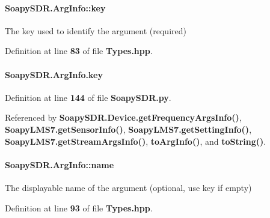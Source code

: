 \paragraph[{key}]{ Soapy\+S\+D\+R.\+Arg\+Info\+::key}\label{classSoapySDR_1_1ArgInfo_a12f61865343917c9c06b579aee3b2491}


The key used to identify the argument (required) 



Definition at line {\bf 83} of file {\bf Types.\+hpp}.

\paragraph[{key}]{\setlength{\rightskip}{0pt plus 5cm}Soapy\+S\+D\+R.\+Arg\+Info.\+key\hspace{0.3cm}{\ttfamily [static]}}\label{classSoapySDR_1_1ArgInfo_ad5250dff7ebe0ad1abc90c71c60303b8}


Definition at line {\bf 144} of file {\bf Soapy\+S\+D\+R.\+py}.



Referenced by {\bf Soapy\+S\+D\+R.\+Device.\+get\+Frequency\+Args\+Info()}, {\bf Soapy\+L\+M\+S7.\+get\+Sensor\+Info()}, {\bf Soapy\+L\+M\+S7.\+get\+Setting\+Info()}, {\bf Soapy\+L\+M\+S7.\+get\+Stream\+Args\+Info()}, {\bf to\+Arg\+Info()}, and {\bf to\+String()}.

\paragraph[{name}]{ Soapy\+S\+D\+R.\+Arg\+Info\+::name}\label{classSoapySDR_1_1ArgInfo_a4c2478f3f3db057499cab60683078bb8}


The displayable name of the argument (optional, use key if empty) 



Definition at line {\bf 93} of file {\bf Types.\+hpp}.



